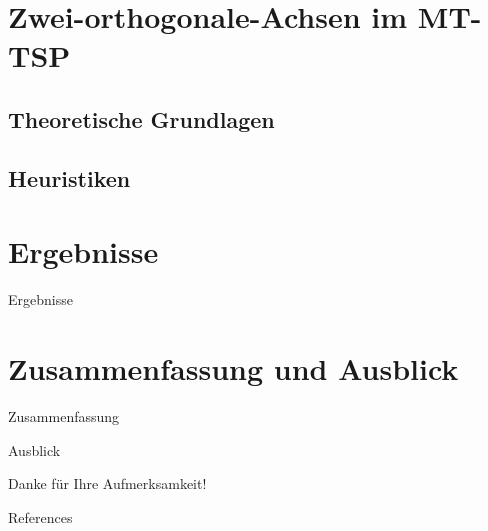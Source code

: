 \documentclass[10pt,table]{beamer}
\begin{document}
\section{Zwei-orthogonale-Achsen im MT-TSP}

\subsection{Theoretische Grundlagen}

\subsection{Heuristiken}

\section{Ergebnisse}
\begin{frame}{Ergebnisse}

\end{frame}

\section{Zusammenfassung und Ausblick}
\begin{frame}{Zusammenfassung}
    
\end{frame}

\begin{frame}{Ausblick}

\end{frame}




\nocite{*}
\appendix
\begin{frame}
\Large\center
Danke für Ihre Aufmerksamkeit!
\end{frame}


\begin{frame}{References} 
	
	
\end{frame}
\end{document}
